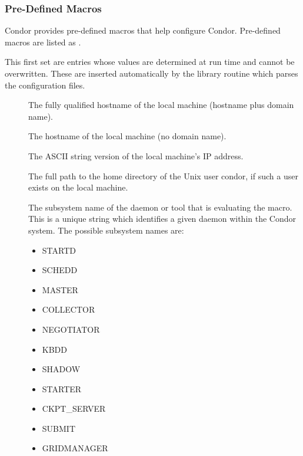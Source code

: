 \subsubsection{\label{sec:Pre-Defined-Macros}
Pre-Defined Macros}

Condor provides pre-defined macros that help configure Condor.
Pre-defined macros are listed as .

This first set are entries whose values are determined at
run time and cannot be overwritten.  These are inserted automatically by
the library routine which parses the configuration files.
\begin{description}
  
\item[] \label{param:FullHostname}
  The
  fully qualified hostname of the local machine (hostname plus domain
  name).
  
\item[] \label{param:Hostname}
  The hostname of the local machine (no domain name).
  
\item[] \label{param:IpAddress}
  The ASCII string version of the local machine's IP address.

\item[] \label{param:Tilde}
  The full path to the
  home directory of the Unix user condor, if such a user exists on the
  local machine.

\label{sec:Condor-Subsystem-Names}
\item[] \label{param:Subsystem}
  The subsystem
  name of the daemon or tool that is evaluating the macro.
  This is a unique string which identifies a given daemon within the
  Condor system.  The possible subsystem names are:

  \begin{itemize}
  \item STARTD
  \item SCHEDD
  \item MASTER
  \item COLLECTOR
  \item NEGOTIATOR
  \item KBDD 
  \item SHADOW
  \item STARTER
  \item CKPT\_SERVER
  \item SUBMIT
  \item GRIDMANAGER
  \label{list:subsystem names}
  \end{itemize}

\end{description}

